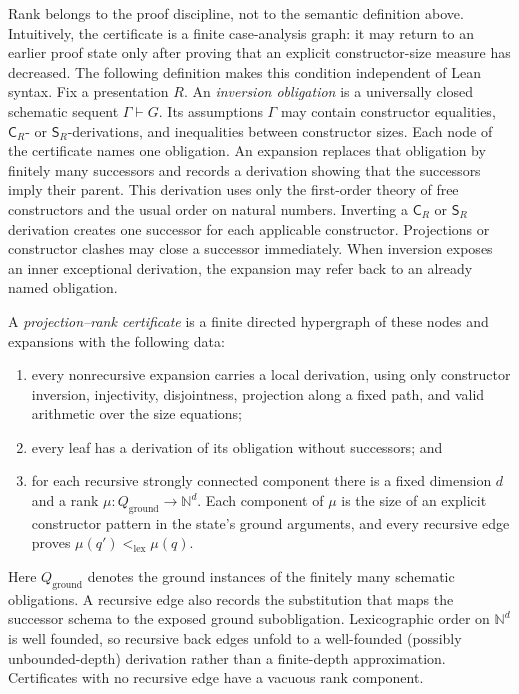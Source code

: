 \documentclass[runningheads]{llncs}
\newcommand{\Code}{\mathsf{C}}
\newcommand{\Step}{\mathsf{S}}
\begin{document}
Rank belongs to the proof discipline, not to the semantic definition above.
Intuitively, the certificate is a finite case-analysis graph: it may return to
an earlier proof state only after proving that an explicit constructor-size
measure has decreased.  The following definition makes this condition
independent of Lean syntax.  Fix a presentation $R$.
An \emph{inversion obligation} is a universally closed schematic sequent
$\Gamma\vdash G$.  Its assumptions $\Gamma$ may contain constructor
equalities, $\Code_R$- or $\Step_R$-derivations, and inequalities between
constructor sizes.  Each node of the certificate names one obligation.  An
expansion replaces that obligation by finitely many successors and records a
derivation showing that the successors imply their parent.  This derivation
uses only the first-order theory of free constructors and the usual order on
natural numbers.  Inverting a $\Code_R$ or $\Step_R$ derivation creates one
successor for each applicable constructor.  Projections or constructor clashes
may close a successor immediately.  When inversion exposes an inner
exceptional derivation, the expansion may refer back to an already named
obligation.

A \emph{projection--rank certificate} is a finite directed hypergraph of these
nodes and expansions with the following data:
\begin{enumerate}
  \item every nonrecursive expansion carries a local derivation, using only
    constructor inversion, injectivity, disjointness, projection along a fixed
    path, and valid arithmetic over the size equations;
  \item every leaf has a derivation of its obligation without successors; and
  \item for each recursive strongly connected component there is a fixed
    dimension $d$ and a rank
    \(\mu:Q_{\mathrm{ground}}\to\mathbb N^d\).  Each component of \(\mu\) is
    the size of an explicit constructor pattern in the state's ground
    arguments, and every recursive edge proves
    \(\mu(q')<_{\mathrm{lex}}\mu(q)\).
\end{enumerate}
Here $Q_{\mathrm{ground}}$ denotes the ground instances of the finitely many
schematic obligations.  A recursive edge also records the substitution that
maps the successor schema to the exposed ground subobligation.  Lexicographic
order on \(\mathbb N^d\) is well founded, so recursive back edges unfold to a
well-founded (possibly unbounded-depth) derivation rather than a finite-depth
approximation.  Certificates with no recursive edge have a vacuous rank
component.
\end{document}
